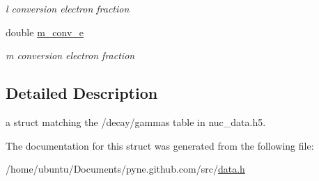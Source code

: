 \begin{DoxyCompactItemize}
\begin{DoxyCompactList}\small\item\em l conversion electron fraction \end{DoxyCompactList}\item 
double \hyperlink{structpyne_1_1gamma_a6c664717050818947e2e79d75e914c41}{m\+\_\+conv\+\_\+e}\hypertarget{structpyne_1_1gamma_a6c664717050818947e2e79d75e914c41}{}\label{structpyne_1_1gamma_a6c664717050818947e2e79d75e914c41}

\begin{DoxyCompactList}\small\item\em m conversion electron fraction \end{DoxyCompactList}\end{DoxyCompactItemize}


\subsection{Detailed Description}
a struct matching the \textquotesingle{}/decay/gammas\textquotesingle{} table in nuc\+\_\+data.\+h5. 

The documentation for this struct was generated from the following file\+:\begin{DoxyCompactItemize}
\item 
/home/ubuntu/\+Documents/pyne.\+github.\+com/src/\hyperlink{data_8h}{data.\+h}\end{DoxyCompactItemize}
